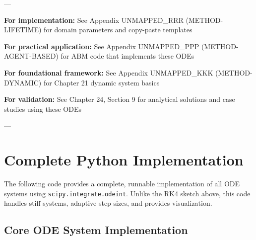 ---


\vspace{1cm}

\begin{tcolorbox}[colback=green!5!white, colframe=green!75!black, title=Relationship to Other Appendices]

\textbf{For implementation:} See Appendix UNMAPPED_RRR (METHOD-LIFETIME) for domain parameters and copy-paste templates

\textbf{For practical application:} See Appendix UNMAPPED_PPP (METHOD-AGENT-BASED) for ABM code that implements these ODEs

\textbf{For foundational framework:} See Appendix UNMAPPED_KKK (METHOD-DYNAMIC) for Chapter 21 dynamic system basics

\textbf{For validation:} See Chapter 24, Section 9 for analytical solutions and case studies using these ODEs

\end{tcolorbox}

---


\section{Complete Python Implementation}
\label{ooo:python}

\begin{tcolorbox}[colback=gray!5!white, colframe=gray!75!black, title=Production-Ready Python Code]
The following code provides a complete, runnable implementation of all ODE systems using
\texttt{scipy.integrate.odeint}. Unlike the RK4 sketch above, this code handles stiff
systems, adaptive step sizes, and provides visualization.
\end{tcolorbox}

\subsection{Core ODE System Implementation}


